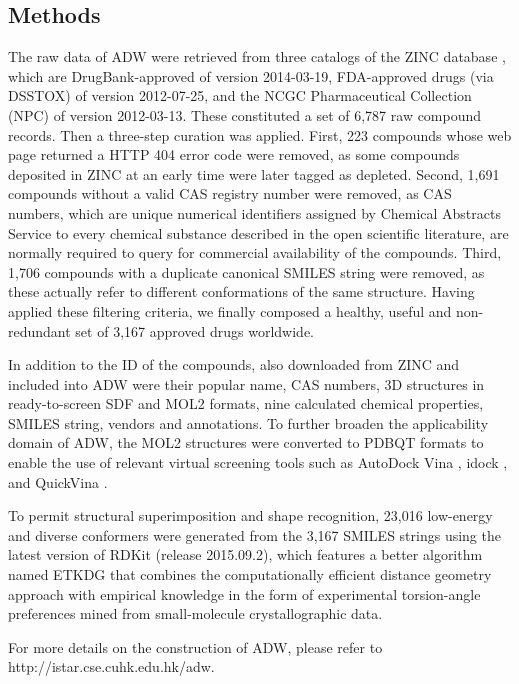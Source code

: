 \documentclass{bioinfo}
\begin{document}
\begin{methods}
\section{Methods}

The raw data of ADW were retrieved from three catalogs of the ZINC database \citep{1178}, which are DrugBank-approved \citep{1594} of version 2014-03-19, FDA-approved drugs (via DSSTOX) of version 2012-07-25, and the NCGC Pharmaceutical Collection (NPC) \citep{1608} of version 2012-03-13. These constituted a set of 6,787 raw compound records. Then a three-step curation was applied. First, 223 compounds whose web page returned a HTTP 404 error code were removed, as some compounds deposited in ZINC at an early time were later tagged as depleted. Second, 1,691 compounds without a valid CAS registry number were removed, as CAS numbers, which are unique numerical identifiers assigned by Chemical Abstracts Service to every chemical substance described in the open scientific literature, are normally required to query for commercial availability of the compounds. Third, 1,706 compounds with a duplicate canonical SMILES string were removed, as these actually refer to different conformations of the same structure. Having applied these filtering criteria, we finally composed a healthy, useful and non-redundant set of 3,167 approved drugs worldwide.


In addition to the ID of the compounds, also downloaded from ZINC and included into ADW were their popular name, CAS numbers, 3D structures in ready-to-screen SDF and MOL2 formats, nine calculated chemical properties, SMILES string, vendors and annotations. To further broaden the applicability domain of ADW, the MOL2 structures were converted to PDBQT formats to enable the use of relevant virtual screening tools such as AutoDock Vina \citep{595}, idock \citep{1362}, and QuickVina \citep{1664}.


To permit structural superimposition and shape recognition, 23,016 low-energy and diverse conformers were generated from the 3,167 SMILES strings using the latest version of RDKit (release 2015.09.2), which features a better algorithm named ETKDG \citep{1697} that combines the computationally efficient distance geometry approach with empirical knowledge in the form of experimental torsion-angle preferences mined from small-molecule crystallographic data.


For more details on the construction of ADW, please refer to http://istar.cse.cuhk.edu.hk/adw.

\end{methods}
\end{document}
